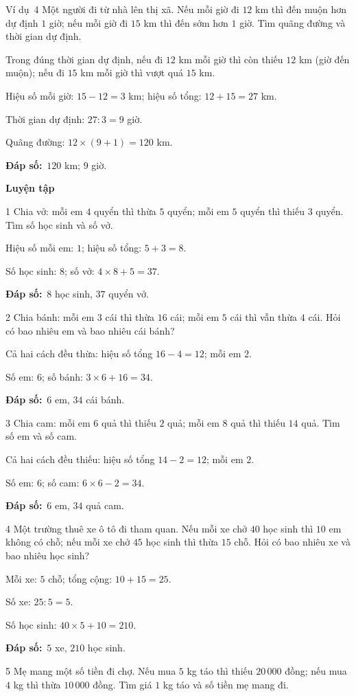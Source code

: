 \documentclass[11pt]{article}
\newif\ifsol \solfalse
\providecommand{\AnsWord}{Đáp số}
\newcommand{\dapso}[1]{\par\textbf{\AnsWord:}\ #1}
\newcommand{\guide}{\par\vspace{4pt}{\bfseries\color{tmBlue}\GuideWord}\par\vspace{3pt}\nopagebreak}
\newcommand{\probsol}[1]{%
  \begin{lrbox}{\solmeasure}\begin{minipage}{\dimexpr\linewidth-24pt\relax}#1\end{minipage}\end{lrbox}%
  \ifsol
    \begin{solbox}#1\end{solbox}%
  \else
    \setlength{\solht}{\dimexpr\ht\solmeasure+\dp\solmeasure+0.85cm\relax}%
    \ifdim\solht<1.35cm\setlength{\solht}{1.35cm}\fi
    \begin{tcolorbox}[colback=white,colframe=Line,boxrule=0.8pt,arc=5pt,
      left=8pt,right=8pt,top=4pt,bottom=4pt,height=\solht]{\footnotesize\color{Slate}\itshape\WorkWord}\end{tcolorbox}%
  \fi}
\newcommand{\dividerbar}[1]{\par\vspace{0.6em}\noindent
  \begin{tcolorbox}[enhanced,frame hidden,interior hidden,borderline west={5pt}{0pt}{ProbBlue},
    colback=white,left=12pt,right=12pt,top=5pt,bottom=5pt,arc=4pt]
  {\large\bfseries\color{ProbBlue} #1}\end{tcolorbox}\vspace{0.4em}}
\newcommand{\gap}{\vspace{0.3cm}}
\def\GuideWord{Hướng dẫn giải.}
\def\WorkWord{Bài làm:}
\def\AnsWord{Đáp số}
\def\ExWord{Ví dụ}
\begin{document}
\gap
\begin{exbox}{\ExWord\ 4}
Một người đi từ nhà lên thị xã. Nếu mỗi giờ đi $12$ km thì đến muộn hơn dự định $1$ giờ; nếu mỗi giờ đi $15$ km thì đến sớm hơn $1$ giờ. Tìm quãng đường và thời gian dự định.
\guide
Trong đúng thời gian dự định, nếu đi $12$ km mỗi giờ thì còn thiếu $12$ km (giờ đến muộn); nếu đi $15$ km mỗi giờ thì vượt quá $15$ km.\par
Hiệu số mỗi giờ: $15-12=3$ km; hiệu số tổng: $12+15=27$ km.\par Thời gian dự định: $27:3=9$ giờ.\par
Quãng đường: $12\times(9+1)=120$ km.
\dapso{$120$ km; $9$ giờ.}
\end{exbox}
\dividerbar{Luyện tập}
\begin{probbox}{1}{\relax}
Chia vở: mỗi em $4$ quyển thì thừa $5$ quyển; mỗi em $5$ quyển thì thiếu $3$ quyển. Tìm số học sinh và số vở.
\end{probbox}
\probsol{
Hiệu số mỗi em: $1$; hiệu số tổng: $5+3=8$.\par Số học sinh: $8$; số vở: $4\times8+5=37$.
\dapso{$8$ học sinh, $37$ quyển vở.}}
\gap
\begin{probbox}{2}{\relax}
Chia bánh: mỗi em $3$ cái thì thừa $16$ cái; mỗi em $5$ cái thì vẫn thừa $4$ cái. Hỏi có bao nhiêu em và bao nhiêu cái bánh?
\end{probbox}
\probsol{
Cả hai cách đều thừa: hiệu số tổng $16-4=12$; mỗi em $2$.\par Số em: $6$; số bánh: $3\times6+16=34$.
\dapso{$6$ em, $34$ cái bánh.}}
\gap
\begin{probbox}{3}{\relax}
Chia cam: mỗi em $6$ quả thì thiếu $2$ quả; mỗi em $8$ quả thì thiếu $14$ quả. Tìm số em và số cam.
\end{probbox}
\probsol{
Cả hai cách đều thiếu: hiệu số tổng $14-2=12$; mỗi em $2$.\par Số em: $6$; số cam: $6\times6-2=34$.
\dapso{$6$ em, $34$ quả cam.}}
\gap
\begin{probbox}{4}{\relax}
Một trường thuê xe ô tô đi tham quan. Nếu mỗi xe chở $40$ học sinh thì $10$ em không có chỗ; nếu mỗi xe chở $45$ học sinh thì thừa $15$ chỗ. Hỏi có bao nhiêu xe và bao nhiêu học sinh?
\end{probbox}
\probsol{
Mỗi xe: $5$ chỗ; tổng cộng: $10+15=25$.\par Số xe: $25:5=5$.\par Số học sinh: $40\times5+10=210$.
\dapso{$5$ xe, $210$ học sinh.}}
\gap
\begin{probbox}{5}{\relax}
Mẹ mang một số tiền đi chợ. Nếu mua $5$ kg táo thì thiếu $20\,000$ đồng; nếu mua $4$ kg thì thừa $10\,000$ đồng. Tìm giá $1$ kg táo và số tiền mẹ mang đi.
\end{probbox}
\end{document}
